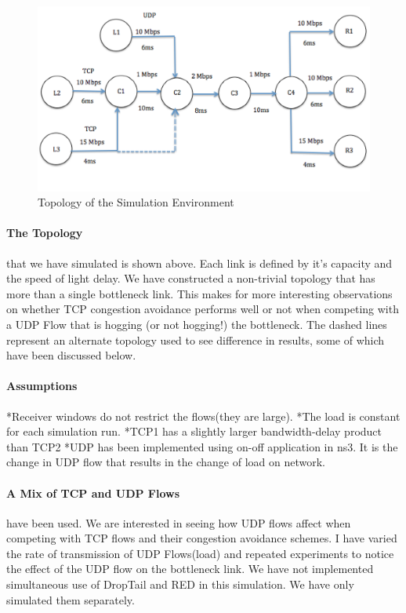 \documentclass[paper=a4, fontsize=12pt]{scrartcl} %
\numberwithin{equation}{section} %
\numberwithin{figure}{section} %
\numberwithin{table}{section} %
\begin{document}
\begin{figure}[h]
\begin{center}
\includegraphics[width=1.02\textwidth]{1} %
\caption{Topology of the Simulation Environment}
\end{center}
\end{figure}
\vspace{-40pt}
\paragraph{The Topology}
that we have simulated is shown above. Each link is defined by it's capacity and the speed of light delay. We have constructed a non-trivial topology that has more than a single bottleneck link. This makes for more interesting observations on whether TCP congestion avoidance performs well or not when competing with a UDP Flow that is hogging (or not hogging!) the bottleneck. The dashed lines represent an alternate topology used to see difference in results, some of which have been discussed below.
\paragraph{Assumptions\newline}
\hspace{-10pt}*Receiver windows do not restrict the flows(they are large). \newline
*The load is constant for each simulation run.\newline
*TCP1 has a slightly larger bandwidth-delay product than TCP2\newline
*UDP has been implemented using on-off application in ns3. It is the change in UDP flow that results in the change of load on network.

\paragraph{A Mix of TCP and UDP Flows}have been used. We are interested in seeing how UDP flows affect when competing with TCP flows and their congestion avoidance schemes. I have varied the rate of transmission of UDP Flows(load) and repeated experiments to notice the effect of the UDP flow on the bottleneck link. We have not implemented simultaneous use of DropTail and RED in this simulation. We have only simulated them separately.
\end{document}
